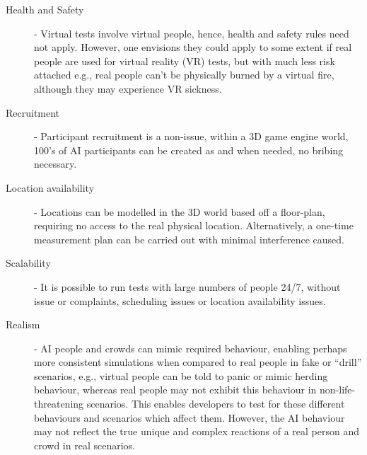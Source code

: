\begin{description}
  \item [Health and Safety] - Virtual tests involve virtual people, hence, health and safety rules need not apply. However, one envisions they could apply to some extent if real people are used for virtual reality (VR) tests, but with much less risk attached e.g., real people can't be physically burned by a virtual fire, although they may experience VR sickness.

  \item [Recruitment] - Participant recruitment is a non-issue, within a 3D game engine world, 100's of AI participants can be created as and when needed, no bribing necessary.

  \item [Location availability] - Locations can be modelled in the 3D world based off a floor-plan, requiring no access to the real physical location. Alternatively, a one-time measurement plan can be carried out with minimal interference caused.

  \item [Scalability] - It is possible to run tests with large numbers of people 24/7, without issue or complaints, scheduling issues or location availability issues.

  \item [Realism] - AI people and crowds can mimic required behaviour, enabling perhaps more consistent simulations when compared to real people in fake or ``drill'' scenarios, e.g., virtual people can be told to panic or mimic herding behaviour, whereas real people may not exhibit this behaviour in non-life-threatening scenarios. This enables developers to test for these different behaviours and scenarios which affect them. However, the AI behaviour may not reflect the true unique and complex reactions of a real person and crowd in real scenarios.
\end{description}

